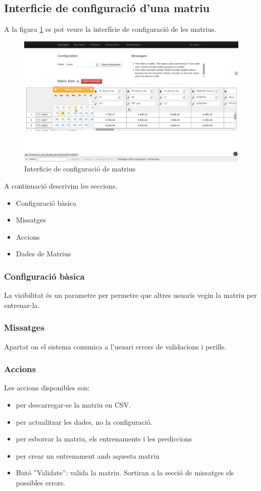 \subsection{Interficie de configuració d'una matriu}
A la figura \ref{fig:configure_matrix} es pot veure la interfície de configuració de les matrius.
\begin{figure}[h!]
  \centering
  \includegraphics[scale=0.2]{img/userguide/matrix_configure.png}
  \caption{Interficie de configuraci\'{o} de matrius}
  \label{fig:configure_matrix}
\end{figure}
A continuació descrivim les seccions.
\begin{itemize}
\item Configuració bàsica
\item Missatges
\item Accions
\item Dades de Matrius
\end{itemize}

\subsubsection{Configuració bàsica}
La visibilitat \'{e}s un parametre per permetre que altres usuaris vegin la matriu per entrenar-la.

\subsubsection{Missatges} 
Apartat on el sistema comunica a l'usuari errors de validacions i perills.

\subsubsection{Accions} 
Les accions disponibles son:
\begin{itemize} 
\item \icondownload per descarregar-se la matriu en CSV.
\item \iconupdate per actualitzar les dades, no la configuració.
\item \icontrash per esborrar la matriu, els entrenaments i les prediccions
\item \icontraining per crear un entrenament amb aquesta matriu
\item But\'{o} ''Validate'': valida la matriu. Sortiran a la secció de missatges els possibles errors.
\end{itemize}


